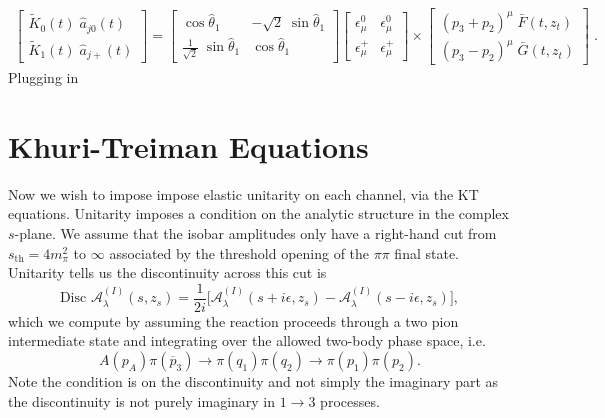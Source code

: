 \documentclass[10pt, aps,prd,amsmath,amssymb,superscriptaddress,onecolumn,
nofootinbib,showpacs,preprintnumbers]{revtex4-1}
\newcommand{\Disc}{\text{Disc }}
\begin{document}
\begin{align}
  \begin{bmatrix}
  \tilde{K}_{0}(t) \; \hat{a}_{j0}(t) \\
    \tilde{K}_{1}(t) \; \hat{a}_{j+}(t)
  \end{bmatrix}
  =
  \begin{bmatrix}
      \cos \hat{\theta}_1  & - \sqrt{2} \; \sin \hat{\theta}_1  \\
     \frac{1}{\sqrt{2}}  \; \sin \hat{\theta}_1  & \cos \hat{\theta}_1
  \end{bmatrix}
  \begin{bmatrix}
    \epsilon^0_\mu  & \epsilon_\mu^0 \\
  \epsilon_\mu^+  & \epsilon_\mu^+
  \end{bmatrix}
  \times
  \begin{bmatrix}
    (p_3 + p_2)^\mu \; \bar{F}(t,z_t) \\
    (p_3 - p_2)^\mu \;  \bar{G}(t,z_t)
  \end{bmatrix}
   \; .
 \end{align}
Plugging in
\section{Khuri-Treiman Equations} \label{sec:unitarity}

Now we wish to impose impose elastic unitarity on each channel, via the KT equations.
Unitarity imposes a condition on the analytic structure in the complex \(s\)-plane. We assume that the isobar amplitudes only have a right-hand cut from \(s_\text{th} = 4m_\pi^2\) to \(\infty\) associated by the threshold opening of the \(\pi\pi\) final state. Unitarity tells us the discontinuity across this cut is
  \begin{equation}
      \Disc \mathcal{A}^{(I)}_\lambda(s,z_s) = \frac{1}{2i} \bigg[ \mathcal{A}^{(I)}_\lambda(s + i\epsilon, z_s) - \mathcal{A}^{(I)}_\lambda(s-i\epsilon,z_s) \bigg],
  \end{equation}
which we compute by assuming the reaction proceeds through a two pion intermediate state and integrating over the allowed two-body phase space, i.e.
  \begin{equation}
    A(p_A) \pi(\overline{p}_3) \rightarrow \pi(q_1)\pi(q_2) \to \pi(p_1) \pi(p_2).
  \end{equation}
Note the condition is on the discontinuity and not simply the imaginary part as the discontinuity is not purely imaginary in \(1 \to 3\) processes.
\end{document}
